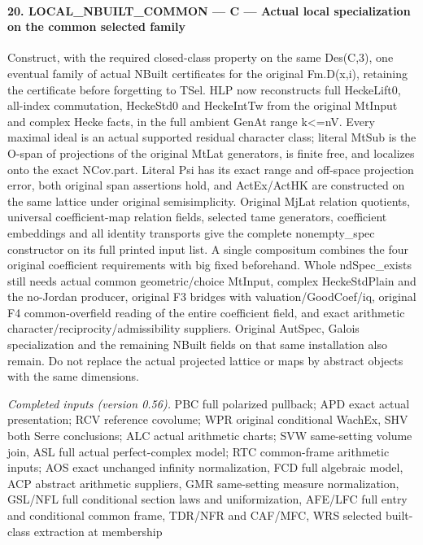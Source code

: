 \paragraph{20. LOCAL\_\allowbreak NBUILT\_\allowbreak COMMON — C — Actual local specialization on the common selected family}

Construct, with the required closed-class property on the same Des(C,3), one eventual family of actual NBuilt certificates for the original Fm.D(x,i), retaining the certificate before forgetting to TSel. HLP now reconstructs full HeckeLift0, all-index commutation, HeckeStd0 and HeckeIntTw from the original MtInput and complex Hecke facts, in the full ambient GenAt range k<=nV. Every maximal ideal is an actual supported residual character class; literal MtSub is the O-span of projections of the original MtLat generators, is finite free, and localizes onto the exact NCov.part. Literal Psi has its exact range and off-space projection error, both original span assertions hold, and ActEx/ActHK are constructed on the same lattice under original semisimplicity. Original MjLat relation quotients, universal coefficient-map relation fields, selected tame generators, coefficient embeddings and all identity transports give the complete nonempty\_\allowbreak spec constructor on its full printed input list. A single compositum combines the four original coefficient requirements with big fixed beforehand. Whole ndSpec\_\allowbreak exists still needs actual common geometric/choice MtInput, complex HeckeStdPlain and the no-Jordan producer, original F3 bridges with valuation/GoodCoef/iq, original F4 common-overfield reading of the entire coefficient field, and exact arithmetic character/reciprocity/admissibility suppliers. Original AutSpec, Galois specialization and the remaining NBuilt fields on that same installation also remain. Do not replace the actual projected lattice or maps by abstract objects with the same dimensions.

\emph{Completed inputs (version 0.56).} PBC full polarized pullback; APD exact actual presentation; RCV reference covolume; WPR original conditional WachEx, SHV both Serre conclusions; ALC actual arithmetic charts; SVW same-setting volume join, ASL full actual perfect-complex model; RTC common-frame arithmetic inputs; AOS exact unchanged infinity normalization, FCD full algebraic model, ACP abstract arithmetic suppliers, GMR same-setting measure normalization, GSL/NFL full conditional section laws and uniformization, AFE/LFC full entry and conditional common frame, TDR/NFR and CAF/MFC, WRS selected built-class extraction at membership

